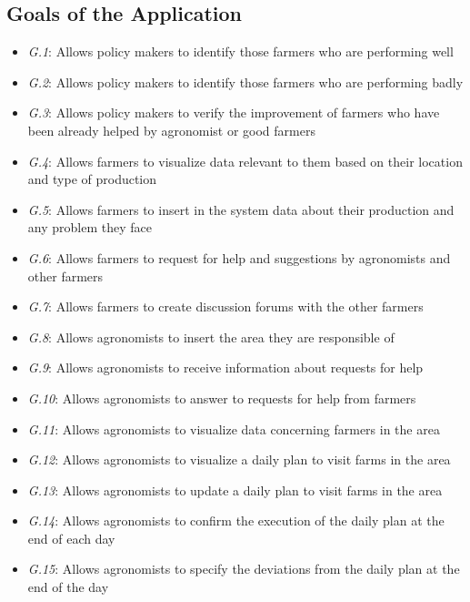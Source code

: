 \subsection{Goals of the Application}
\begin{itemize}
    \item \textit {G.1}: Allows policy makers to identify those farmers who are performing well
    \item \textit {G.2}: Allows policy makers to identify those farmers who are performing badly
    \item \textit {G.3}: Allows policy makers to verify the improvement of farmers who have been already helped by agronomist or good farmers
    \item \textit {G.4}: Allows farmers to visualize data relevant to them based on their location and type of production
    \item \textit {G.5}: {\color{red}  Allows farmers to insert in the system data about their production and any problem they face}
    \item \textit {G.6}: Allows farmers to request for help and suggestions by agronomists and other farmers
    \item \textit {G.7}: Allows farmers to create discussion forums with the other farmers
    \item \textit {G.8}: {\color{red}  Allows agronomists to insert the area they are responsible of}
    \item \textit {G.9}: {\color{red}  Allows agronomists to receive information about requests for help}
    \item \textit {G.10}: Allows agronomists to answer to requests for help from farmers
    \item \textit {G.11}: Allows agronomists to visualize data concerning farmers in the area
    \item \textit {G.12}: Allows agronomists to visualize a daily plan to visit farms in the area
    \item \textit {G.13}: Allows agronomists to update a daily plan to visit farms in the area
    \item \textit {G.14}: Allows agronomists to confirm the execution of the daily plan at the end of each day 
    \item \textit {G.15}: Allows agronomists to specify the deviations from the daily plan at the end of the day

\end{itemize}